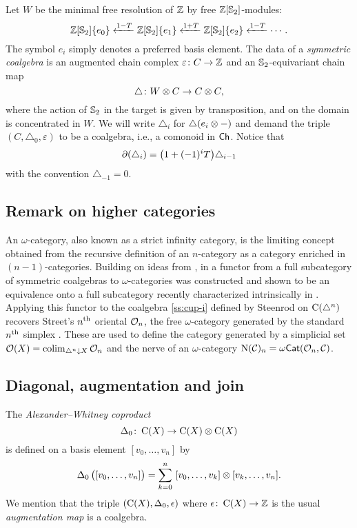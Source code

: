 Let $W$ be the minimal free resolution of $\mathbb{Z}$ by free $\mathbb{Z}[\mathbb{S}_2]$-modules:
\[
\mathbb{Z}[\mathbb{S}_2]\{e_0\} \xleftarrow{1-T} \mathbb{Z}[\mathbb{S}_2]\{e_1\} \xleftarrow{1+T} \mathbb{Z}[\mathbb{S}_2]\{e_2\} \xleftarrow{1-T} \dotsb.
\]
The symbol $e_i$ simply denotes a preferred basis element.
The data of a \textit{symmetric coalgebra} is an augmented chain complex $\varepsilon \colon C \to \mathbb{Z}$ and an $\mathbb{S}_2$-equivariant chain map
\[
\triangle \colon W \otimes C \to C \otimes C,
\]
where the action of $\mathbb{S}_2$ in the target is given by transposition, and on the domain is concentrated in $W$.
We will write $\triangle_i$ for $\triangle(e_i \otimes -)$ and demand the triple $(C, \triangle_0, \varepsilon)$ to be a coalgebra, i.e., a comonoid in $\mathsf{Ch}$.
Notice that
\[
\operatorname{\partial}(\triangle_i) = \big( 1+(-1)^i T \big) \triangle_{i-1}
\]
with the convention $\triangle_{-1} = 0$.

\subsection{Remark on higher categories}\label{ss:higher categories}

An $\omega$-category, also known as a strict infinity category, is the limiting concept obtained from the recursive definition of an $n$-category as a category enriched in $(n-1)$-categories.
Building on ideas from \cite{brown1981cubes, kapranov1991polycategory, steiner2004omega}, in \cite{medina2020globular} a functor from a full subcategory of symmetric coalgebras to $\omega$-categories was constructed and shown to be an equivalence onto a full subcategory recently characterized intrinsically in \cite{ozornova2022steiner}.
Applying this functor to the coalgebra \cref{ss:cup-i} defined by Steenrod on $\operatorname{C}(\triangle^n)$ recovers Street's $n^{\mathrm{th}}$ oriental $\mathcal{O}_n$, the free $\omega$-category generated by the standard $n^{\mathrm{th}}$ simplex \cite{street1987orientals}.
These are used to define the category generated by a simplicial set $\mathcal{O}(X) = \operatorname*{colim}_{\triangle^n \downarrow X} \mathcal{O}_n$ and the nerve of an $\omega$-category $\mathrm{N}(\mathcal{C})_n = \omega \mathsf{Cat}(\mathcal{O}_n, \mathcal{C})$.

\subsection{Diagonal, augmentation and join}

The \textit{Alexander--Whitney coproduct}
\[
\operatorname{\Delta}_0 \colon \operatorname{C}(X) \to \operatorname{C}(X) \otimes \operatorname{C}(X)
\]
is defined on a basis element $[v_0, \dots, v_n]$ by
\begin{equation*}\label{e:alexander-whitney coalgebra}
	\operatorname{\Delta}_0 \big( [v_0, \dots, v_n] \big) =
	\sum_{k=0}^n \ [v_0, \dots, v_k] \otimes [v_k, \dots, v_n].
\end{equation*}
We mention that the triple $(\operatorname{C}(X), \operatorname{\Delta}_0, \operatorname{\epsilon})$ where $\operatorname{\epsilon} \colon \operatorname{C}(X) \to \mathbb{Z}$ is the usual \textit{augmentation map} is a coalgebra.

